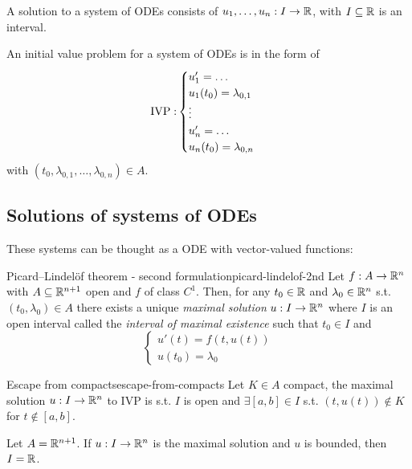 \documentclass[12pt]{extarticle}
\begin{document}
A solution to a system of ODEs consists of $u_1, \dots, u_n: I \to \mathbb{R}$, with $I \subseteq \mathbb{R}$ is an interval.

An initial value problem for a system of ODEs is in the form of
\begin{equation}
    {\operatorfont IVP:}
    \begin{cases}
        u_1' = \ldots             \\
        u_1(t_0) = \lambda_{0, 1} \\
        \vdots                    \\
        u_n' = \ldots             \\
        u_n(t_0) = \lambda_{0, n} \\
    \end{cases}
\end{equation}
with $(t_0, \lambda_{0,1}, \dots, \lambda_{0,n}) \in A$.

\subsection{Solutions of systems of ODEs}

These systems can be thought as a ODE with vector-valued functions:
\begin{theorem}{Picard–Lindelöf theorem - second formulation}{picard-lindelof-2nd}
    Let $f: A \to \mathbb{R}^n$ with $A \subseteq \mathbb{R}^{n+1}$ open and $f$ of class $C^1$.
    Then, for any $t_0 \in \mathbb{R}$ and $\lambda_0 \in \mathbb{R}^n$ s.t. $(t_0, \lambda_0) \in A$ there exists a unique \emph{maximal solution}
    $u: I \to \mathbb{R}^n$
    where $I$ is an open interval called the \emph{interval of maximal existence} such that $t_0 \in I$ and
    \begin{equation}
        \begin{cases}
            u'(t) = f(t, u(t)) \\
            u(t_0) = \lambda_0
        \end{cases}
    \end{equation}
\end{theorem}

\begin{theorem}{Escape from compacts}{escape-from-compacts}
    Let $K \in A$ compact, the maximal solution $u: I \to \mathbb{R}^n$ to IVP is s.t. $I$ is open and $\exists [a, b] \in I$ s.t. $(t, u(t)) \notin K$ for $t \notin [a, b]$.
\end{theorem}

\begin{corollary}{}{}
    Let $A = \mathbb{R}^{n+1}$. If $u: I \to \mathbb{R}^n$ is the maximal solution and $u$ is bounded, then $I = \mathbb{R}$.
\end{corollary}
\end{document}
